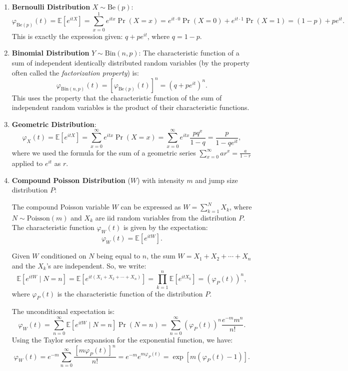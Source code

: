 \begin{enumerate}[label=(\alph*)]
    \item 
    \textbf{Bernoulli Distribution} \(X \sim \text{Be}(p)\):
    \[
    \varphi_{\text{Be}(p)}(t) = \mathbb{E}[e^{itX}] = \sum_{x=0}^1 e^{itx} \Pr(X = x) = e^{it \cdot 0} \Pr(X=0) + e^{it \cdot 1} \Pr(X=1) = (1-p) + pe^{it}.
    \]
    This is exactly the expression given: \(q + p e^{it}\), where \(q = 1-p\).
    
    \item 
    \textbf{Binomial Distribution} \(Y \sim \text{Bin}(n,p)\):
    The characteristic function of a sum of independent identically distributed random variables (by the property often called the \emph{factorization property}) is:
    \[
    \varphi_{\text{Bin}(n,p)}(t) = [\varphi_{\text{Be}(p)}(t)]^n = (q + pe^{it})^n.
    \]
    This uses the property that the characteristic function of the sum of independent random variables is the product of their characteristic functions.
    
    \item 
    \textbf{Geometric Distribution}:
    \[
    \varphi_{X}(t) = \mathbb{E}[e^{itX}] = \sum_{x=0}^\infty e^{itx} \Pr(X = x) = \sum_{x=0}^\infty e^{itx} \frac{p q^x}{1-q} = \frac{p}{1-qe^{it}},
    \]
    where we used the formula for the sum of a geometric series \(\sum_{x=0}^\infty ar^x = \frac{a}{1-r}\) applied to \(e^{it}\) as \(r\).
    

\item 
\textbf{Compound Poisson Distribution} (\( W \)) with intensity \( m \) and jump size distribution \( P \):

The compound Poisson variable \( W \) can be expressed as \( W = \sum_{k=1}^N X_k \), where \( N \sim \text{Poisson}(m) \) and \( X_k \) are iid random variables from the distribution \( P \). The characteristic function \( \varphi_{W}(t) \) is given by the expectation:
\[
\varphi_{W}(t) = \mathbb{E}[e^{itW}].
\]

Given \( W \) conditioned on \( N \) being equal to \( n \), the sum \( W = X_1 + X_2 + \cdots + X_n \) and the \( X_k \)'s are independent. So, we write:
\[
\mathbb{E}[e^{itW} \mid N=n] = \mathbb{E}[e^{it(X_1 + X_2 + \cdots + X_n)}] = \prod_{k=1}^n \mathbb{E}[e^{itX_k}] = (\varphi_P(t))^n,
\]
where \( \varphi_P(t) \) is the characteristic function of the distribution \( P \).

The unconditional expectation is:
\[
\varphi_{W}(t) = \sum_{n=0}^\infty \mathbb{E}[e^{itW} \mid N=n] \Pr(N = n) = \sum_{n=0}^\infty (\varphi_P(t))^n \frac{e^{-m} m^n}{n!}.
\]
Using the Taylor series expansion for the exponential function, we have:
\[
\varphi_{W}(t) = e^{-m} \sum_{n=0}^\infty \frac{[m \varphi_P(t)]^n}{n!} = e^{-m} e^{m \varphi_P(t)} = \exp[m(\varphi_P(t) - 1)].
\]


\end{enumerate}
